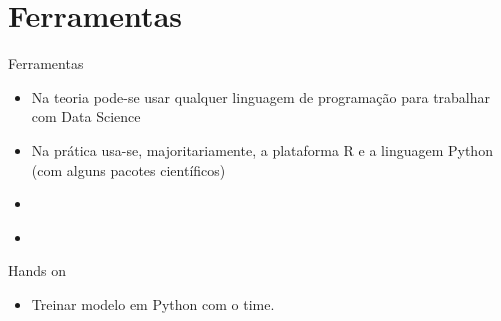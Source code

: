 \section{Ferramentas}

\begin{frame}	
	\begin{block}{Ferramentas}	
		\begin{itemize}
			\item Na teoria pode-se usar qualquer linguagem de programação para trabalhar com Data Science
			\item Na prática usa-se, majoritariamente, a plataforma R e a linguagem Python (com alguns pacotes científicos)
			\item \href{http://scikit-learn.org/stable/}{\color{blue}{Sci-kit learn}}
			\item \href{https://www.r-bloggers.com}{\color{blue}{blog sobre R}}
						
		\end{itemize}		
	\end{block}
\end{frame}

\begin{frame}	
	\begin{block}{Hands on}	
		\begin{itemize}
			\item Treinar modelo em Python com o time.
		\end{itemize}		
	\end{block}
\end{frame}
